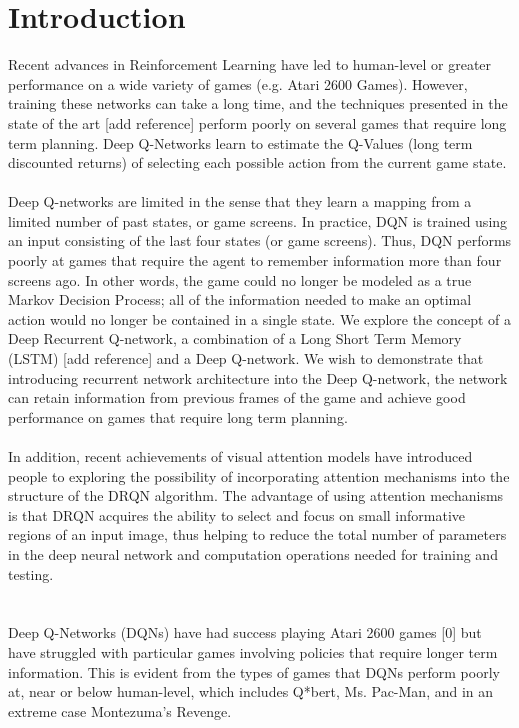 \documentclass{article}
\begin{document}
\section{Introduction}
    Recent advances in Reinforcement Learning have led to human-level or greater
    performance on a wide variety of games (e.g. Atari 2600 Games).  However,
    training these networks can take a long time, and the techniques presented in
    the state of the art [add reference] perform poorly on several games that
    require long term planning.  Deep Q-Networks learn to estimate the Q-Values
    (long term discounted returns) of selecting each possible action from the
    current game state. \\
    \\
    Deep Q-networks are limited in the sense that they learn a mapping from a
    limited number of past states, or game screens.  In practice, DQN is trained
    using an input consisting of the last four states (or game screens).  Thus,
    DQN performs poorly at games that require the agent to remember information
    more than four screens ago.  In other words, the game could no longer be
    modeled as a true Markov Decision Process; all of the information needed to
    make an optimal action would no longer be contained in a single state.  We
    explore the concept of a Deep Recurrent Q-network, a combination of a Long
    Short Term Memory (LSTM) [add reference] and a Deep Q-network.  We wish to
    demonstrate that introducing recurrent network architecture into the Deep
    Q-network, the network can retain information from previous frames of the
    game and achieve good performance on games that require long term planning. \\
    \\
    In addition, recent achievements of visual attention models have introduced
    people to exploring the possibility of incorporating attention mechanisms
    into the structure of the DRQN algorithm.  The advantage of using attention
    mechanisms is that DRQN acquires the ability to select and focus on small
    informative regions of an input image, thus helping to reduce the total
    number of parameters in the deep neural network and computation operations
    needed for training and testing.  \\
    \\
    \\
    Deep Q-Networks (DQNs) have had success playing Atari 2600 games [0] but have 
    struggled with particular games involving policies that require longer term
    information. This is evident from the types of games that DQNs perform poorly at,
    near or below human-level, which includes Q*bert, Ms. Pac-Man, and in an extreme
    case Montezuma's Revenge.
\end{document}
